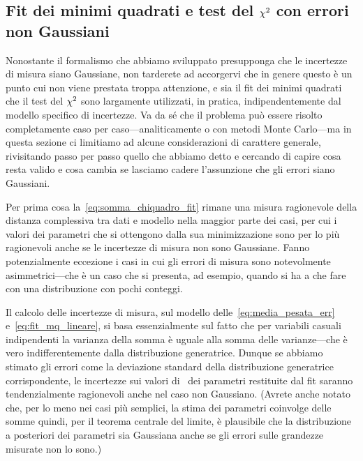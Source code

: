 \subsection{Fit dei minimi quadrati e  test del \texorpdfstring{$\chi^2$}{chi2}
  con errori non Gaussiani}

Nonostante il formalismo che abbiamo sviluppato presupponga che le incertezze
di misura siano Gaussiane, non tarderete ad accorgervi che in genere questo è
un punto cui non viene prestata troppa attenzione, e sia il fit dei minimi
quadrati che il test del $\chi^2$ sono largamente utilizzati, in pratica,
indipendentemente dal modello specifico di incertezze. Va da sé che il
problema può essere risolto completamente caso per caso---analiticamente o
con metodi Monte Carlo---ma in questa sezione ci limitiamo ad alcune
considerazioni di carattere generale, rivisitando passo per passo quello che
abbiamo detto e cercando di capire cosa resta valido e cosa cambia se lasciamo
cadere l'assunzione che gli errori siano Gaussiani.

Per prima cosa la~\eqref{eq:somma_chiquadro_fit} rimane una misura ragionevole
della distanza complessiva tra dati e modello nella maggior parte dei casi, per
cui i valori dei parametri che si ottengono dalla sua minimizzazione sono per lo
più ragionevoli anche se le incertezze di misura non sono Gaussiane. Fanno
potenzialmente eccezione i casi in cui gli errori di misura sono notevolmente
asimmetrici---che è un caso che si presenta, ad esempio, quando si ha a che
fare con una distribuzione con pochi conteggi.

Il calcolo delle incertezze di misura, sul modello
delle~\eqref{eq:media_pesata_err} e~\eqref{eq:fit_mq_lineare}, si basa
essenzialmente sul fatto che per variabili casuali indipendenti la varianza
della somma è uguale alla somma delle varianze---che è vero
indifferentemente dalla distribuzione generatrice. Dunque se abbiamo stimato
gli errori come la deviazione standard della distribuzione generatrice
corrispondente, le incertezze sui valori di \bestfit\ dei parametri
restituite dal fit saranno tendenzialmente ragionevoli
anche nel caso non Gaussiano. (Avrete anche notato che, per lo meno nei casi
più semplici, la stima dei parametri coinvolge delle somme quindi, per il
teorema centrale del limite, è plausibile che la distribuzione a posteriori
dei parametri sia Gaussiana anche se gli errori sulle grandezze misurate non lo
sono.)

